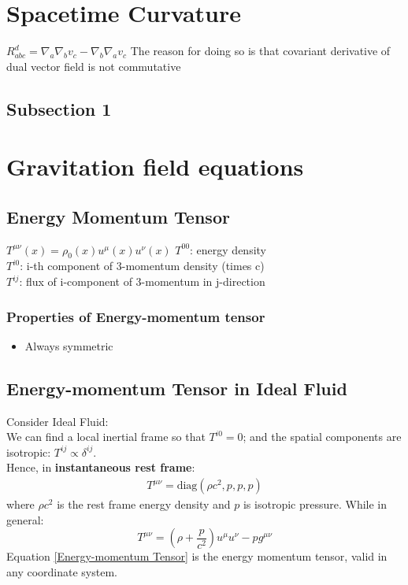 \documentclass[12pt,a4paper]{article}
\begin{document}
\section{Spacetime Curvature}
    {$R_{abc}^d=\nabla_a\nabla_b v_c-\nabla_b\nabla_a v_c$}
    {The reason for doing so is that covariant derivative of dual vector field is not commutative}
    \subsection{Subsection 1}
\section{Gravitation field equations}
    \subsection{Energy Momentum Tensor}
        {$T^{\mu\nu}(x)=\rho_0(x) u^\mu(x) u^\nu(x)$}
        {
        $T^{00}$: energy density\\
        $T^{i0}$: i-th component of 3-momentum density (times c)\\
        $T^{ij}$: flux of i-component of 3-momentum in j-direction
        }
    \subsubsection{Properties of Energy-momentum tensor}
    \begin{itemize}
        \item Always symmetric
    \end{itemize}
    \subsection{Energy-momentum Tensor in Ideal Fluid}
        Consider Ideal Fluid:\\
        We can find a local inertial frame so that $T^{i0}=0$; and the spatial components are isotropic: $T^{ij}\propto\delta^{ij}$.\\
        Hence, in \textbf{instantaneous rest frame}:
        \begin{align*}
            T^{\mu\nu}= \text{diag}(\rho c^2,p,p,p)
        \end{align*}
        where $\rho c^2$ is the rest frame energy density and $p$ is isotropic pressure.
        While in general:
        \begin{equation}\label{Energy-momentum Tensor}
            T^{\mu\nu}= (\rho+\dfrac{p}{c^2})u^\mu u^\nu - pg^{\mu\nu}
        \end{equation}
        Equation \ref{Energy-momentum Tensor} is the energy momentum tensor, valid in any coordinate system.\\
\end{document}
